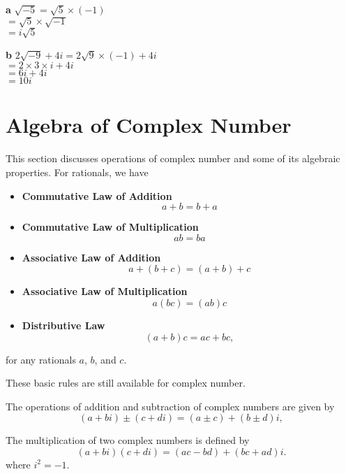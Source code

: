 \textbf{a} \(\sqrt{-5} = \sqrt{5} \times (-1)\) \\
 \(= \sqrt{5} \times \sqrt{-1}\) \\
 \(= i\sqrt{5}\)

\textbf{b} \(2\sqrt{-9} + 4i = 2\sqrt{9} \times (-1) + 4i\) \\
 \(= 2 \times 3 \times i + 4i\) \\
 \(= 6i + 4i\) \\
 \(= 10i\)
\section{Algebra of Complex Number} 
This section discusses operations of complex number and some of its algebraic properties.
For rationals, we have \begin{itemize}
    \item \textbf{Commutative Law of Addition}
    \[ a + b = b + a \]
    
    \item \textbf{Commutative Law of Multiplication}
    \[ ab = ba \]
    
    \item \textbf{Associative Law of Addition}
    \[ a + (b + c) = (a + b) + c \]
    
    \item \textbf{Associative Law of Multiplication}
    \[ a(bc) = (ab)c \]
    
    \item \textbf{Distributive Law}
    \[ (a + b)c = ac + bc, \]
\end{itemize}

for any rationals \( a \), \( b \), and \( c \).

These basic rules are still available for complex number.

\begin{definition}
    The operations of addition and subtraction of complex numbers are given by
\[
(a + bi) \pm (c + di) = (a \pm c) + (b \pm d)i,
\]
\end{definition}

\begin{definition}
    The multiplication of two complex numbers is defined by
\[
(a + bi)(c + di) = (ac - bd) + (bc + ad)i.
\]
where $i^2=-1$.
\end{definition}

